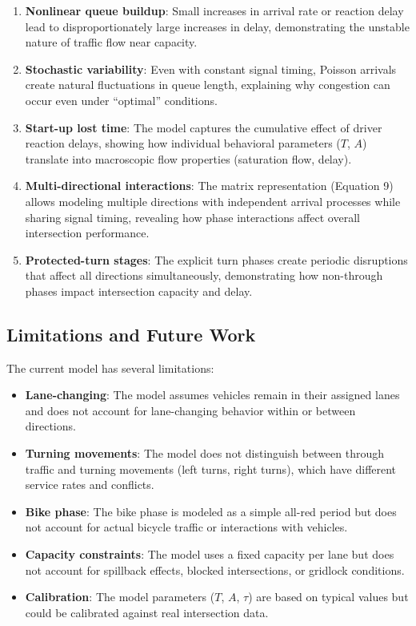 \begin{enumerate}
    \item \textbf{Nonlinear queue buildup}: Small increases in arrival rate or reaction delay lead to disproportionately large increases in delay, demonstrating the unstable nature of traffic flow near capacity.
    
    \item \textbf{Stochastic variability}: Even with constant signal timing, Poisson arrivals create natural fluctuations in queue length, explaining why congestion can occur even under ``optimal'' conditions.
    
    \item \textbf{Start-up lost time}: The model captures the cumulative effect of driver reaction delays, showing how individual behavioral parameters ($T$, $A$) translate into macroscopic flow properties (saturation flow, delay).
    
    \item \textbf{Multi-directional interactions}: The matrix representation (Equation 9) allows modeling multiple directions with independent arrival processes while sharing signal timing, revealing how phase interactions affect overall intersection performance.
    
    \item \textbf{Protected-turn stages}: The explicit turn phases create periodic disruptions that affect all directions simultaneously, demonstrating how non-through phases impact intersection capacity and delay.
\end{enumerate}

\subsection{Limitations and Future Work}

The current model has several limitations:

\begin{itemize}
    \item \textbf{Lane-changing}: The model assumes vehicles remain in their assigned lanes and does not account for lane-changing behavior within or between directions.
    
    \item \textbf{Turning movements}: The model does not distinguish between through traffic and turning movements (left turns, right turns), which have different service rates and conflicts.
    
    \item \textbf{Bike phase}: The bike phase is modeled as a simple all-red period but does not account for actual bicycle traffic or interactions with vehicles.
    
    \item \textbf{Capacity constraints}: The model uses a fixed capacity per lane but does not account for spillback effects, blocked intersections, or gridlock conditions.
    
    \item \textbf{Calibration}: The model parameters ($T$, $A$, $\tau$) are based on typical values but could be calibrated against real intersection data.
\end{itemize}

